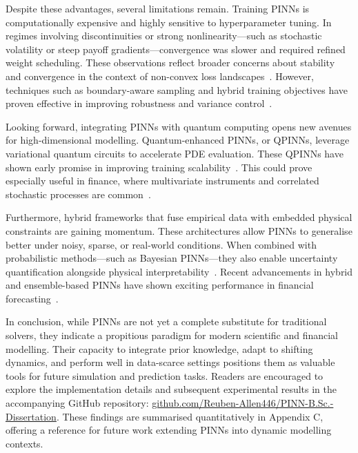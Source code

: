 \documentclass[12pt,a4paper]{article}
\begin{document}
Despite these advantages, several limitations remain. Training PINNs is computationally expensive and highly sensitive to hyperparameter tuning. In regimes involving discontinuities or strong nonlinearity—such as stochastic volatility or steep payoff gradients—convergence was slower and required refined weight scheduling. These observations reflect broader concerns about stability and convergence in the context of non-convex loss landscapes~\cite{mishra2022estimates}. However, techniques such as boundary-aware sampling and hybrid training objectives have proven effective in improving robustness and variance control~\cite{wang2022understanding}.

Looking forward, integrating PINNs with quantum computing opens new avenues for high-dimensional modelling. Quantum-enhanced PINNs, or QPINNs, leverage variational quantum circuits to accelerate PDE evaluation. These QPINNs have shown early promise in improving training scalability~\cite{zhang2022quantum}. This could prove especially useful in finance, where multivariate instruments and correlated stochastic processes are common~\cite{mcardle2020quantum}.

Furthermore, hybrid frameworks that fuse empirical data with embedded physical constraints are gaining momentum. These architectures allow PINNs to generalise better under noisy, sparse, or real-world conditions. When combined with probabilistic methods—such as Bayesian PINNs—they also enable uncertainty quantification alongside physical interpretability~\cite{finlay2022train}. Recent advancements in hybrid and ensemble-based PINNs have shown exciting performance in financial forecasting~\cite{yang2023hybrid}.

In conclusion, while PINNs are not yet a complete substitute for traditional solvers, they indicate a propitious paradigm for modern scientific and financial modelling. Their capacity to integrate prior knowledge, adapt to shifting dynamics, and perform well in data-scarce settings positions them as valuable tools for future simulation and prediction tasks. Readers are encouraged to explore the implementation details and subsequent experimental results in the accompanying GitHub repository: \href{https://github.com/Reuben-Allen446/PINN-B.Sc.-Dissertation}{github.com/Reuben-Allen446/PINN-B.Sc.-Dissertation}. These findings are summarised quantitatively in Appendix C, offering a reference for future work extending PINNs into dynamic modelling contexts.

\newpage
\appendix
\renewcommand{\thesection}{\Alph{section}}
\end{document}
